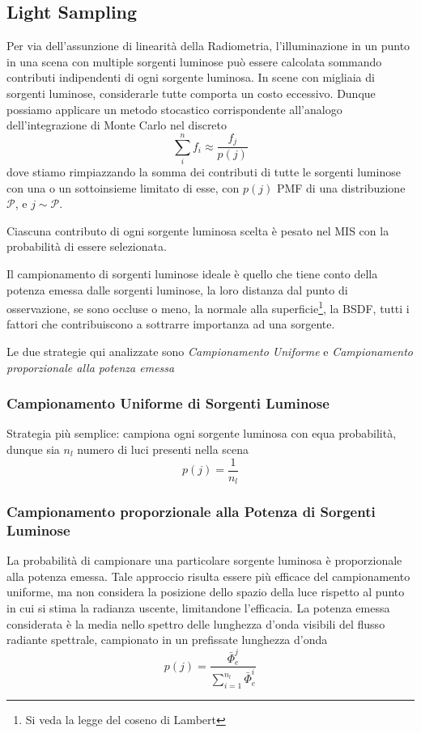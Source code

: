 \subsection{Light Sampling}
Per via dell'assunzione di linearit\`a della Radiometria, l'illuminazione in un punto in una scena con multiple sorgenti luminose pu\`o essere 
calcolata sommando contributi indipendenti di ogni sorgente luminosa. In scene con migliaia di sorgenti luminose, considerarle tutte comporta un 
costo eccessivo. Dunque possiamo applicare un metodo stocastico corrispondente all'analogo dell'integrazione di Monte Carlo nel discreto 
\cite{pharr}
\begin{equation}
	\sum_i^nf_i\approx\frac{f_j}{p(j)}
\end{equation}
dove stiamo rimpiazzando la somma dei contributi di tutte le sorgenti luminose con una o un sottoinsieme limitato di esse, con $p(j)$ PMF di 
una distribuzione $\mathcal{P}$, e $j\sim\mathcal{P}$.\par
Ciascuna contributo di ogni sorgente luminosa scelta \`e pesato nel MIS con la probabilit\`a di essere selezionata.\par 
Il campionamento di sorgenti luminose ideale \`e quello che tiene conto della potenza emessa dalle sorgenti luminose, la loro distanza dal 
punto di osservazione, se sono occluse o meno, la normale alla superficie\footnote{Si veda la legge del coseno di Lambert}, la BSDF, tutti i fattori 
che contribuiscono a sottrarre importanza ad una sorgente.\par
Le due strategie qui analizzate sono \textit{Campionamento Uniforme} e \textit{Campionamento proporzionale alla potenza emessa}
\subsubsection{Campionamento Uniforme di Sorgenti Luminose}\label{chapter3:light:sampling}
Strategia pi\`u semplice: campiona ogni sorgente luminosa con equa probabilit\`a, dunque sia $n_l$ numero di luci presenti nella scena
\begin{equation}
	p(j)=\frac{1}{n_l}
\end{equation}
\subsubsection{Campionamento proporzionale alla Potenza di Sorgenti Luminose}
La probabilit\`a di campionare una particolare sorgente luminosa \`e proporzionale alla potenza emessa. Tale approccio risulta essere pi\`u efficace
del campionamento uniforme, ma non considera la posizione dello spazio della luce rispetto al punto in cui si stima la radianza uscente, limitandone
l'efficacia. La potenza emessa considerata \`e la media nello spettro delle lunghezza d'onda visibili del flusso radiante spettrale, campionato in 
un prefissate lunghezza d'onda 
\begin{equation}
	p(j)=\frac{\bar{\Phi}_{e}^j}{\sum_{i=1}^{n_l}\bar{\Phi}_{e}^i}
\end{equation}
